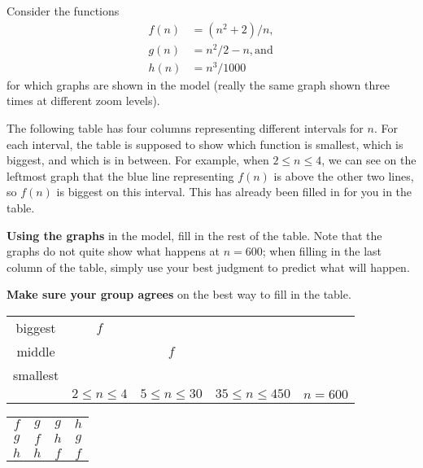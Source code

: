 \documentclass{tufte-handout}
\begin{document}
Consider the functions
\begin{align*}
  f(n) &= (n^2 + 2)/n, \\ g(n) &= n^2/2 - n, \text{and} \\ h(n) &= n^3/1000
\end{align*}
for which graphs are shown in the model (really the same graph shown
three times at different zoom levels).
\begin{questions}
\item \label{q:table}
  The following table has four columns representing different
  intervals for $n$.  For each interval, the table is supposed to show
  which function is smallest, which is biggest, and which is in
  between.  For example, when $2 \leq n \leq 4$, we can see on the
  leftmost graph that the blue line representing $f(n)$ is above the
  other two lines, so $f(n)$ is biggest on this interval.  This has
  already been filled in for you in the table.

  \textbf{Using the graphs} in the model, fill in the rest of the
  table. Note that the graphs do not quite show what happens at $n = 600$;
  when filling in the last column of the table, simply use your best
  judgment to predict what will happen.

  \textbf{Make sure your group agrees} on the best way to fill in the table.

  \setlength{\tabcolsep}{20pt}
  \renewcommand{\arraystretch}{2}
  \begin{fullwidth}
  \begin{tabular}{c|cccc}
    biggest & $f$ & & & \\
    middle & & $f$ & & \\
    smallest & & & & \\
    \hline
        & $2 \leq n \leq 4$ & $5 \leq n \leq 30$ & $35 \leq n \leq 450$ & $n = 600$
  \end{tabular}
  \end{fullwidth}

  \begin{answer}
    \setlength{\tabcolsep}{20pt}
    \renewcommand{\arraystretch}{1}
    \begin{tabular}{cccc}
    $f$ & $g$ & $g$ & $h$ \\
    $g$ & $f$ & $h$ & $g$ \\
    $h$ & $h$ & $f$ & $f$
    \end{tabular}
  \end{answer}


\end{questions}
\end{document}
